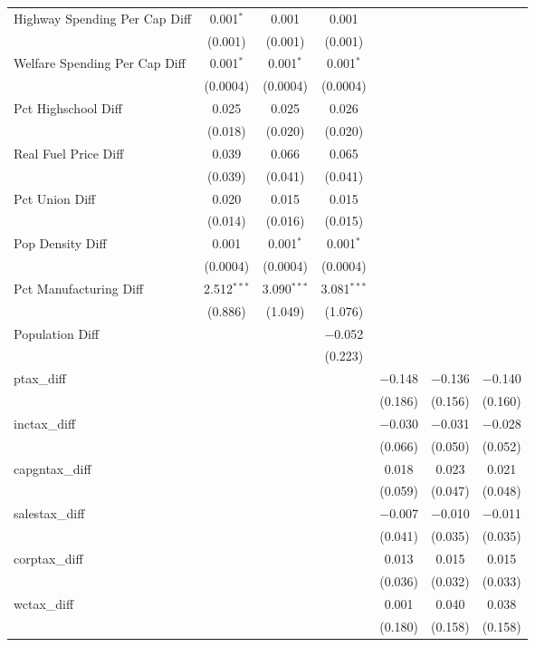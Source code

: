 \begin{table}[!htbp]
\begin{tabular}{@{\extracolsep{5pt}}lcccccc}
  Highway Spending Per Cap Diff & 0.001$^{*}$ & 0.001 & 0.001 &  &  &  \\ 
  & (0.001) & (0.001) & (0.001) &  &  &  \\ 
  Welfare Spending Per Cap Diff & 0.001$^{*}$ & 0.001$^{*}$ & 0.001$^{*}$ &  &  &  \\ 
  & (0.0004) & (0.0004) & (0.0004) &  &  &  \\ 
  Pct Highschool Diff & 0.025 & 0.025 & 0.026 &  &  &  \\ 
  & (0.018) & (0.020) & (0.020) &  &  &  \\ 
  Real Fuel Price Diff & 0.039 & 0.066 & 0.065 &  &  &  \\ 
  & (0.039) & (0.041) & (0.041) &  &  &  \\ 
  Pct Union Diff & 0.020 & 0.015 & 0.015 &  &  &  \\ 
  & (0.014) & (0.016) & (0.015) &  &  &  \\ 
  Pop Density Diff & 0.001 & 0.001$^{*}$ & 0.001$^{*}$ &  &  &  \\ 
  & (0.0004) & (0.0004) & (0.0004) &  &  &  \\ 
  Pct Manufacturing Diff & 2.512$^{***}$ & 3.090$^{***}$ & 3.081$^{***}$ &  &  &  \\ 
  & (0.886) & (1.049) & (1.076) &  &  &  \\ 
  Population Diff &  &  & $-$0.052 &  &  &  \\ 
  &  &  & (0.223) &  &  &  \\ 
  ptax\_diff &  &  &  & $-$0.148 & $-$0.136 & $-$0.140 \\ 
  &  &  &  & (0.186) & (0.156) & (0.160) \\ 
  inctax\_diff &  &  &  & $-$0.030 & $-$0.031 & $-$0.028 \\ 
  &  &  &  & (0.066) & (0.050) & (0.052) \\ 
  capgntax\_diff &  &  &  & 0.018 & 0.023 & 0.021 \\ 
  &  &  &  & (0.059) & (0.047) & (0.048) \\ 
  salestax\_diff &  &  &  & $-$0.007 & $-$0.010 & $-$0.011 \\ 
  &  &  &  & (0.041) & (0.035) & (0.035) \\ 
  corptax\_diff &  &  &  & 0.013 & 0.015 & 0.015 \\ 
  &  &  &  & (0.036) & (0.032) & (0.033) \\ 
  wctax\_diff &  &  &  & 0.001 & 0.040 & 0.038 \\ 
  &  &  &  & (0.180) & (0.158) & (0.158) \\ 

\end{tabular}
\end{table}
